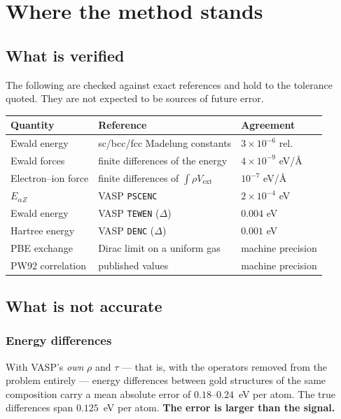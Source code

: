 \documentclass[11pt,a4paper]{report}
\newcommand{\opt}[1]{\texttt{#1}}
\newcommand{\vext}{V_{\mathrm{ext}}}
\begin{document}
\tableofcontents

\chapter{Where the method stands}

\section{What is verified}

The following are checked against exact references and hold to the tolerance
quoted. They are not expected to be sources of future error.

\begin{center}
\begin{tabular}{@{}lll@{}}
\toprule
Quantity & Reference & Agreement \\
\midrule
Ewald energy & sc/bcc/fcc Madelung constants & $3\times10^{-6}$ rel. \\
Ewald forces & finite differences of the energy & $4\times10^{-9}$ eV/\AA \\
Electron--ion force & finite differences of $\int\rho\vext$ & $10^{-7}$ eV/\AA \\
$E_{\alpha Z}$ & VASP \opt{PSCENC} & $2\times10^{-4}$ eV \\
Ewald energy & VASP \opt{TEWEN} ($\Delta$) & $0.004$ eV \\
Hartree energy & VASP \opt{DENC} ($\Delta$) & $0.001$ eV \\
PBE exchange & Dirac limit on a uniform gas & machine precision \\
PW92 correlation & published values & machine precision \\
\bottomrule
\end{tabular}
\end{center}

\section{What is not accurate}

\subsection{Energy differences}

With VASP's \emph{own} $\rho$ and $\tau$ --- that is, with the operators
removed from the problem entirely --- energy differences between gold
structures of the same composition carry a mean absolute error of
$0.18$--$0.24$~eV per atom. The true differences span $0.125$~eV per atom.
\textbf{The error is larger than the signal.}
\end{document}
